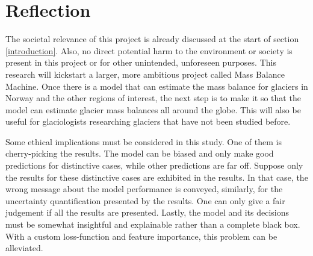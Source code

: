 \section{Reflection}

The societal relevance of this project is already discussed at the start of section \ref{introduction}. Also, no direct potential harm to the environment or society is present in this project or for other unintended, unforeseen purposes. This research will kickstart a larger, more ambitious project called Mass Balance Machine. Once there is a model that can estimate the mass balance for glaciers in Norway and the other regions of interest, the next step is to make it so that the model can estimate glacier mass balances all around the globe. This will also be useful for glaciologists researching glaciers that have not been studied before. 

Some ethical implications must be considered in this study. One of them is cherry-picking the results. The model can be biased and only make good predictions for distinctive cases, while other predictions are far off. Suppose only the results for these distinctive cases are exhibited in the results. In that case, the wrong message about the model performance is conveyed, similarly, for the uncertainty quantification presented by the results. One can only give a fair judgement if all the results are presented. Lastly, the model and its decisions must be somewhat insightful and explainable rather than a complete black box. With a custom loss-function and feature importance, this problem can be alleviated. 
